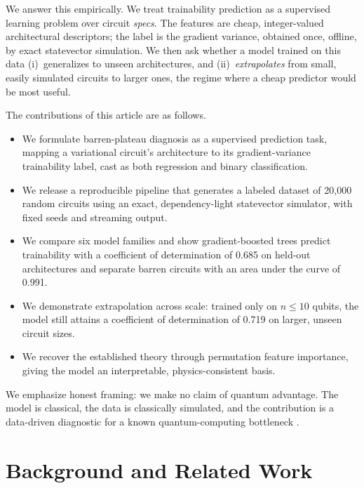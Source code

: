 \documentclass{ieeeaccess}
\newcommand{\Nrows}{20{,}000}
\newcommand{\RsqHold}{0.685}
\newcommand{\AucHold}{0.991}
\newcommand{\ExtrapCut}{10}
\newcommand{\RsqExtrap}{0.719}
\begin{document}
We answer this empirically. We treat trainability prediction as a supervised
learning problem over circuit \emph{specs}. The features are cheap, integer-valued
architectural descriptors; the label is the gradient variance, obtained once,
offline, by exact statevector simulation. We then ask whether a model trained on
this data (i)~generalizes to unseen architectures, and (ii)~\emph{extrapolates}
from small, easily simulated circuits to larger ones, the regime where a cheap
predictor would be most useful.

The contributions of this article are as follows.
\begin{itemize}
\item We formulate barren-plateau diagnosis as a supervised prediction task,
mapping a variational circuit's architecture to its gradient-variance trainability
label, cast as both regression and binary classification.
\item We release a reproducible pipeline that generates a labeled dataset of
\Nrows{} random circuits using an exact, dependency-light statevector simulator,
with fixed seeds and streaming output.
\item We compare six model families and show gradient-boosted trees predict
trainability with a coefficient of determination of \RsqHold{} on held-out
architectures and separate barren circuits with an area under the curve of
\AucHold{}.
\item We demonstrate extrapolation across scale: trained only on
$n\le\ExtrapCut{}$ qubits, the model still attains a coefficient of determination
of \RsqExtrap{} on larger, unseen circuit sizes.
\item We recover the established theory through permutation feature importance,
giving the model an interpretable, physics-consistent basis.
\end{itemize}

We emphasize honest framing: we make no claim of quantum advantage. The model is
classical, the data is classically simulated, and the contribution is a data-driven
diagnostic for a known quantum-computing bottleneck
\cite{schuld2022killoran,bowles2024benchmarking}.

\section{Background and Related Work}
\end{document}
